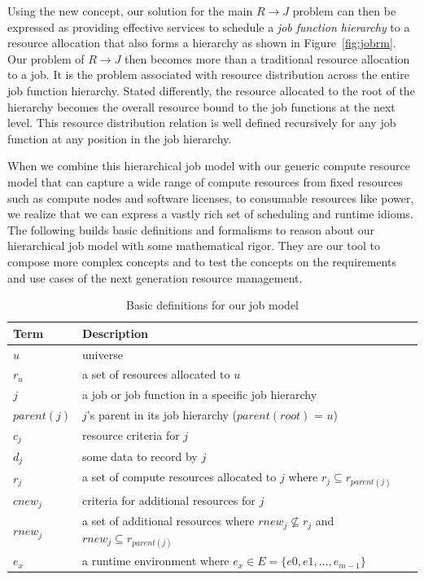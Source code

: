 \documentclass[10pt]{article}
\begin{document}
Using the new concept, our solution for the main 
$R \rightarrow J$ problem can then be expressed as
providing effective services to schedule 
a {\em job function hierarchy} to a resource allocation 
that also forms a hierarchy as shown in 
Figure~\ref{fig:jobrm}.
Our problem of $R \rightarrow J$ then becomes more than a traditional 
resource allocation to a job. It is the problem associated with
resource distribution across the entire job function hierarchy. 
Stated differently, the resource allocated to the root of the hierarchy 
becomes the overall resource bound to the job functions at
the next level. This resource distribution relation is well defined 
recursively for any job function at any position in the job hierarchy.

When we combine this hierarchical job model with our generic 
compute resource model that can capture a wide range 
of compute resources from fixed resources such as compute nodes 
and software licenses, to consumable resources like power, 
we realize that we can express a vastly rich set 
of scheduling and runtime idioms. 
The following builds basic definitions and formalisms
to reason about our hierarchical job model with some mathematical rigor.
They are our tool to compose more complex concepts
and to test the concepts on the requirements and use cases 
of the next generation resource management. 

\begin{table}
\centering
\begin{tabular}{|l|l|}
\hline 
Term & Description \\
\hline 
$u$ & universe  \\
$r_u$ & a set of resources allocated to $u$ \\ 
$j$ & a job or job function in a specific job hierarchy \\
$parent(j)$ & $j$'s parent in its job hierarchy ($parent(root)$ = $u$) \\
$c_j$ & resource criteria for $j$ \\
$d_j$ & some data to record by $j$ \\ 
$r_j$ & a set of compute resources allocated to $j$ where $r_j \subseteq r_{parent(j)}$ \\
$cnew_j$ & criteria for additional resources for $j$ \\
$rnew_j$ & a set of additional resources where $rnew_j \not\subseteq r_j$ and $rnew_j \subseteq r_{parent(j)}$ \\
$e_x$ & a runtime environment where $e_x \in E = \{e0, e1, ..., e_{m-1}\}$ \\
\hline
\end{tabular}
\caption{Basic definitions for our job model}
\label{tab:def}
\end{table}
\end{document}
